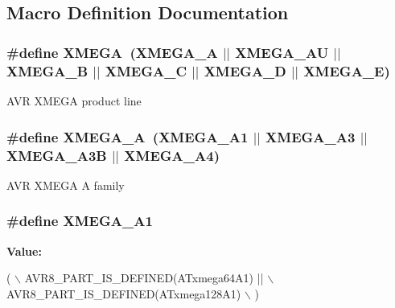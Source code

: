 \subsection{Macro Definition Documentation}
\hypertarget{group__xmega__part__macros__group_ga959bff90afbae437308a52eeb67b3368}{
\subsubsection[{X\-M\-E\-G\-A}]{\setlength{\rightskip}{0pt plus 5cm}\#define X\-M\-E\-G\-A~({\bf X\-M\-E\-G\-A\-\_\-\-A} $|$$|$ {\bf X\-M\-E\-G\-A\-\_\-\-A\-U} $|$$|$ {\bf X\-M\-E\-G\-A\-\_\-\-B} $|$$|$ {\bf X\-M\-E\-G\-A\-\_\-\-C} $|$$|$ {\bf X\-M\-E\-G\-A\-\_\-\-D} $|$$|$ {\bf X\-M\-E\-G\-A\-\_\-\-E})}}\label{group__xmega__part__macros__group_ga959bff90afbae437308a52eeb67b3368}
A\-V\-R X\-M\-E\-G\-A product line \hypertarget{group__xmega__part__macros__group_gab903a90d3a0bc99d7248eaecbb325a23}{
\subsubsection[{X\-M\-E\-G\-A\-\_\-\-A}]{\setlength{\rightskip}{0pt plus 5cm}\#define X\-M\-E\-G\-A\-\_\-\-A~({\bf X\-M\-E\-G\-A\-\_\-\-A1} $|$$|$ {\bf X\-M\-E\-G\-A\-\_\-\-A3} $|$$|$ {\bf X\-M\-E\-G\-A\-\_\-\-A3\-B} $|$$|$ {\bf X\-M\-E\-G\-A\-\_\-\-A4})}}\label{group__xmega__part__macros__group_gab903a90d3a0bc99d7248eaecbb325a23}
A\-V\-R X\-M\-E\-G\-A A family \hypertarget{group__xmega__part__macros__group_gaa0df665226b6faf69dcc137f1b78f074}{
\subsubsection[{X\-M\-E\-G\-A\-\_\-\-A1}]{\setlength{\rightskip}{0pt plus 5cm}\#define X\-M\-E\-G\-A\-\_\-\-A1}}\label{group__xmega__part__macros__group_gaa0df665226b6faf69dcc137f1b78f074}
{\bfseries Value\-:}
\begin{DoxyCode}
( \(\backslash\)
        AVR8\_PART\_IS\_DEFINED(ATxmega64A1)  || \(\backslash\)
        AVR8\_PART\_IS\_DEFINED(ATxmega128A1) \(\backslash\)
        )
\end{DoxyCode}
